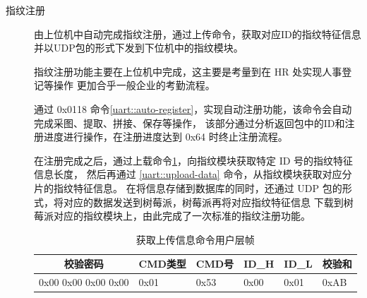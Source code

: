     \begin{description}
        \item[指纹注册] 由上位机中自动完成指纹注册，通过上传命令，获取对应ID的指纹特征信息并以UDP包的形式下发到下位机中的指纹模块。
        
        指纹注册功能主要在上位机中完成，这主要是考量到在 HR 处实现人事登记等操作
        更加合乎一般企业的考勤流程。
        
        通过 0x0118 命令\ref{uart::auto-register}，实现自动注册功能，该命令会自动完成采图、提取、拼接、保存等操作，
        该部分通过分析返回包中的ID和注册进度进行操作，在注册进度达到 0x64 时终止注册流程。

        \begin{table}[htbp]
            \caption{自动注册命令用户层帧} \label{uart::auto-register}
        \end{table}

        在注册完成之后，通过上载命令\ref{uart::upload-info}，向指纹模块获取特定 ID 号的指纹特征信息长度，
        然后再通过 \ref{uart::upload-data} 命令，从指纹模块获取对应分片的指纹特征信息。
        在将信息存储到数据库的同时，还通过 UDP 包的形式，将对应的数据发送到树莓派，树莓派再将对应指纹特征信息
        下载到树莓派对应的指纹模块上，由此完成了一次标准的指纹注册功能。

        \begin{table}[htbp]
            \centering
            \caption{获取上传信息命令用户层帧} \label{uart::upload-info}
            \begin{tabular}{llllll}
            \hline
            \multicolumn{1}{c}{校验密码} & CMD类型 & CMD号 & ID\_H & ID\_L & 校验和  \\ \hline
            0x00 0x00 0x00 0x00        & 0x01  & 0x53 & 0x00  & 0x01  & 0xAB \\ \hline
            \end{tabular}
        \end{table}

        \begin{table}[htbp]
            \caption{获取指纹特征命令用户层帧} \label{uart::upload-data}
        \end{table}


\end{description}
